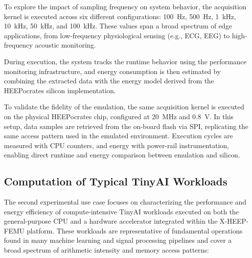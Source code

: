             To explore the impact of sampling frequency on system behavior, the acquisition kernel is executed across six different configurations: \SI{100}{\hertz}, \SI{500}{\hertz}, \SI{1}{\kilo\hertz}, \SI{10}{\kilo\hertz}, \SI{50}{\kilo\hertz}, and \SI{100}{\kilo\hertz}. These values span a broad spectrum of edge applications, from low-frequency physiological sensing (e.g., ECG, EEG) to high-frequency acoustic monitoring.
            
            During execution, the system tracks the runtime behavior using the performance monitoring infrastructure, and energy consumption is then estimated by combining the extracted data with the energy model derived from the \mbox{HEEPocrates} silicon implementation.
            
            To validate the fidelity of the emulation, the same acquisition kernel is executed on the physical \mbox{HEEPocrates} chip, configured at \SI{20}{\mega\hertz} and \SI{0.8}{\volt}. In this setup, data samples are retrieved from the on-board flash via SPI, replicating the same access pattern used in the emulated environment. Execution cycles are measured with CPU counters, and energy with power-rail instrumentation, enabling direct runtime and energy comparison between emulation and silicon.

        \subsection{Computation of Typical TinyAI Workloads}
        
            The second experimental use case focuses on characterizing the performance and energy efficiency of compute-intensive TinyAI workloads executed on both the general-purpose CPU and a hardware accelerator integrated within the \mbox{X-HEEP-FEMU} platform. These workloads are representative of fundamental operations found in many machine learning and signal processing pipelines and cover a broad spectrum of arithmetic intensity and memory access patterns:

